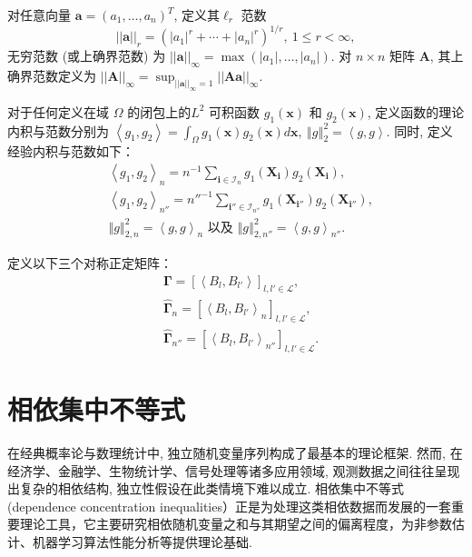\documentclass[a4paper,openay,14pt]{ctexbook}
\numberwithin{equation}{section}
\numberwithin{lem}{section}
\begin{document}
对任意向量 $\mathbf{a} = \left(a_1, \ldots, a_n\right)^T$, 定义其$\ell_r$ 范数
$$||\mathbf{a}||_r = \left( |a_1|^r + \cdots + |a_n|^r \right)^{1/r},\ 1 \leq r < \infty,$$
无穷范数 (或上确界范数) 为
\(
||\mathbf{a}||_{\infty} = \max \left( |a_1|, \ldots, |a_n| \right).
\)
对 $n \times n$ 矩阵 $\mathbf{A}$, 其上确界范数定义为
\(||\mathbf{A}||_{\infty} = \sup_{||\mathbf{a}||_{\infty} = 1} ||\mathbf{A}\mathbf{a}||_{\infty}.\)

对于任何定义在域 $\Omega$ 的闭包上的$L^2$ 可积函数 $g_1(\boldsymbol{x})$ 和 $g_2(\boldsymbol{x})$, 定义函数的理论内积与范数分别为
\(\left<g_1,g_2\right> = \int_{\Omega}g_1(\boldsymbol{x})g_2(\boldsymbol{x})d\boldsymbol{x},~\left\Vert g\right\Vert^2_2 = \left<g,g\right>\). 同时, 定义经验内积与范数如下：
\begin{align*}
 &\left<g_1,g_2\right>_{n} = n^{-1}\sum_{\mathbf{i} \in \mathcal{I}_n} g_1(\boldsymbol{X}_{\mathbf{i}})g_2(\boldsymbol{X}_{\mathbf{i}}),\\
 & \left<g_1,g_2\right>_{n''} = n''^{-1}\sum_{\mathbf{i}''\in\mathcal{I}_{n''}}g_1(\boldsymbol{X}_{\mathbf{i}''})g_2(\boldsymbol{X}_{\mathbf{i}''}),\\
 & \left\Vert g\right\Vert^{2}_{2,n} = \left<g,g\right>_{n}\text{ 以及 } \left\Vert g\right\Vert^{2}_{2,n''} = \left<g,g\right>_{n''}.
\end{align*}

定义以下三个对称正定矩阵：
\begin{align}
    &\bm{\Gamma} = \left[\left\langle B_l,B_{l'}\right\rangle\right]_{l,l'\in\mathcal{L}}, \label{EQU:Gammalambda}\\
    &\hat{\bm{\Gamma}}_{n} = \left[\left\langle B_l,B_{l'}\right\rangle_{n}\right]_{l,l'\in\mathcal{L}},\label{EQU:hatGammalambdan}\\
    &\hat{\bm{\Gamma}}_{n''} = \left[\left\langle B_l,B_{l'}\right\rangle_{n''}\right]_{l,l'\in\mathcal{L}}. \label{EQU:hatGammalambdan''}
\end{align}


\section{相依集中不等式}
在经典概率论与数理统计中, 独立随机变量序列构成了最基本的理论框架. 然而, 在经济学、金融学、生物统计学、信号处理等诸多应用领域, 观测数据之间往往呈现出复杂的相依结构, 独立性假设在此类情境下难以成立. 相依集中不等式(dependence concentration inequalities）正是为处理这类相依数据而发展的一套重要理论工具，它主要研究相依随机变量之和与其期望之间的偏离程度，为非参数估计、机器学习算法性能分析等提供理论基础.
\end{document}
